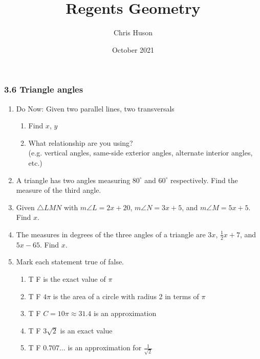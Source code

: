 \documentclass[12pt, twoside]{article}
\title{Regents Geometry}
\author{Chris Huson}
\date{October 2021}
\begin{document}
\subsubsection*{3.6 Triangle angles}
\begin{enumerate}
\item Do Now: Given two parallel lines, two transversals
\begin{multicols}{2}
  \begin{enumerate}
    \item Find $x$, $y$
    \item What relationship are you using? \\[0.5cm]
    (e.g. vertical angles, same-side exterior angles, alternate interior angles, etc.)
  \end{enumerate}
\end{multicols}

\item A triangle has two angles measuring $80^\circ$ and $60^\circ$ respectively. Find the measure of the third angle. \vspace{2cm}

\item Given  $\triangle LMN$ with $m\angle L=2x+20$, $m\angle N=3x+5$, and $m\angle M=5x+5$. Find $x$.
  \begin{flushright}
  \end{flushright} \vspace{2cm}

\item The measures in degrees of the three angles of a triangle are $3x$, $\frac{1}{2}x+7$, and $5x-65$. Find $x$. \vspace{4cm}

\newpage
\item Mark each statement true of false.
\begin{enumerate}[itemsep=0.3cm]
  \item T \quad F  is the exact value of $\pi$
  \item T \quad F \qquad $4\pi$ is the area of a circle with radius 2 in terms of $\pi$
  \item T \quad F \qquad $C = 10\pi \approx 31.4$ is an approximation
  \item T \quad F \qquad $3\sqrt{2}$ is an exact value
  \item T \quad F \qquad $0.707\dots$ is an approximation for $\displaystyle \frac{1}{\sqrt{2}}$
\end{enumerate}


\end{enumerate}
\end{document}

